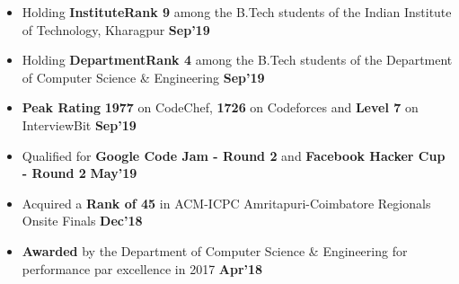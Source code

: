 \documentclass[10pt]{article}
\begin{document}
\vspace{-3ex}
\spacedhrule{0.15ex}{1.0ex}
\begin{itemize}[leftmargin=*]
\item Holding \textbf{InstituteRank 9} among the B.Tech students of the Indian Institute of Technology, Kharagpur {\hfill}\textbf{Sep'19}\\[-1.8em]
\item Holding \textbf{DepartmentRank 4} among the B.Tech students of the Department of Computer Science \& Engineering {\hfill}\textbf{Sep'19}\\[-1.8em]
\item \textbf{Peak Rating} \textbf{1977} on CodeChef, \textbf{1726} on Codeforces and \textbf{Level 7} on InterviewBit \href{https://github.com/shmundhra/Credentials/tree/master/Competitive\%20Programming/Online\%20Judges\%20Profiles} {\hspace{0.5ex}\footnotesize\faMousePointer} {\hfill}\textbf{Sep'19}\\[-1.8em]
\item Qualified for \textbf{Google Code Jam - Round 2} and \textbf{Facebook Hacker Cup - Round 2} \href{https://github.com/shmundhra/Credentials/tree/master/Competitive\%20Programming/Google\%20CodeJam} {\hspace{1ex}\footnotesize\faMousePointer} \href{https://github.com/shmundhra/Credentials/tree/master/Competitive\%20Programming/Facebook\%20Hacker\%20Cup} {\hspace{0.5ex}\footnotesize\faMousePointer} {\hfill}\textbf{May'19}\\[-1.8em]
\item Acquired a \textbf{Rank of 45} in ACM-ICPC Amritapuri-Coimbatore Regionals Onsite Finals \href{https://github.com/shmundhra/Credentials/tree/master/Competitive\%20Programming/ACM\%20ICPC\%202018} {\hspace{0.5ex}\footnotesize\faMousePointer} {\hfill}\textbf{Dec'18}\\[-1.8em]
\item \textbf{Awarded} by the Department of Computer Science \& Engineering for performance par excellence in 2017 \href{https://github.com/shmundhra/Credentials/blob/master/Academics/Student_Par_Excellence.pdf} {\hspace{0.5ex}\footnotesize\faMousePointer} {\hfill}\textbf{Apr'18}\\[-1.8em]

\end{itemize}
\end{document}
